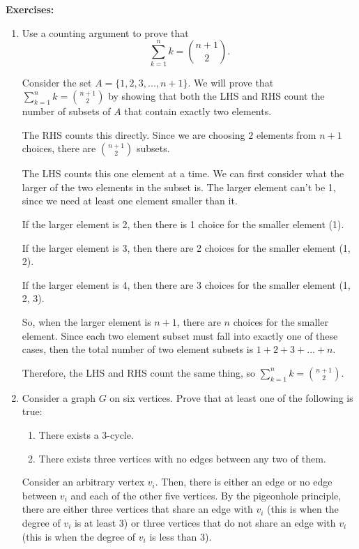 \documentclass[12pt,letterpaper]{article}
\begin{document}
\textbf{Exercises:}
\begin{enumerate}

\item Use a counting argument to prove that
\[
\sum_{k=1}^{n}k =\binom{n+1}{2}.
\]
\begin{mdframed}
Consider the set $A = \{1, 2, 3, ..., n+1\}$. We will prove that $\sum_{k=1}^{n}k =\binom{n+1}{2}$ by showing that both the LHS and RHS count the number of subsets of $A$ that contain exactly two elements.

The RHS counts this directly. Since we are choosing $2$ elements from $n+1$ choices, there are $n+1 \choose 2$ subsets.

The LHS counts this one element at a time. We can first consider what the larger of the two elements in the subset is. The larger element can't be 1, since we need at least one element smaller than it.

If the larger element is 2, then there is 1 choice for the smaller element (1).

If the larger element is 3, then there are 2 choices for the smaller element (1, 2).

If the larger element is 4, then there are 3 choices for the smaller element (1, 2, 3).

So, when the larger element is $n+1$, there are $n$ choices for the smaller element. Since each two element subset must fall into exactly one of these cases, then the total number of two element subsets is $1+2+3+...+n$.

Therefore, the LHS and RHS count the same thing, so $\sum_{k=1}^{n}k =\binom{n+1}{2}$.
\end{mdframed}

\item Consider a graph $G$ on six vertices. Prove that at least one of the following is true:
\begin{enumerate}
\item There exists a 3-cycle.
\item There exists three vertices with no edges between any two of them.
\end{enumerate}
\begin{mdframed}
Consider an arbitrary vertex $v_i$. Then, there is either an edge or no edge between $v_i$ and each of the other five vertices. By the pigeonhole principle, there are either three vertices that share an edge with $v_i$ (this is when the degree of $v_i$ is at least 3) or three vertices that do not share an edge with $v_i$ (this is when the degree of $v_i$ is less than 3).


\end{mdframed}
\end{enumerate}
\end{document}
